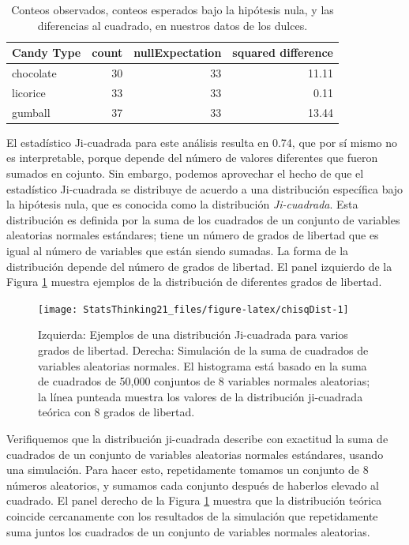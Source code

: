 \documentclass[
  12pt,
]{book}
\begin{document}
\begin{table}

\caption{\label{tab:candyDf}Conteos observados, conteos esperados bajo la hipótesis nula, y las diferencias al cuadrado, en nuestros datos de los dulces.}
\centering
\begin{tabular}[t]{l|r|r|r}
\hline
Candy Type & count & nullExpectation & squared difference\\
\hline
chocolate & 30 & 33 & 11.11\\
\hline
licorice & 33 & 33 & 0.11\\
\hline
gumball & 37 & 33 & 13.44\\
\hline
\end{tabular}
\end{table}

El estadístico Ji-cuadrada para este análisis resulta en 0.74, que por sí mismo no es interpretable, porque depende del número de valores diferentes que fueron sumados en cojunto. Sin embargo, podemos aprovechar el hecho de que el estadístico Ji-cuadrada se distribuye de acuerdo a una distribución específica bajo la hipótesis nula, que es conocida como la distribución \emph{Ji-cuadrada}. Esta distribución es definida por la suma de los cuadrados de un conjunto de variables aleatorias normales estándares; tiene un número de grados de libertad que es igual al número de variables que están siendo sumadas. La forma de la distribución depende del número de grados de libertad. El panel izquierdo de la Figura \ref{fig:chisqDist} muestra ejemplos de la distribución de diferentes grados de libertad.

\begin{figure}
\texttt{[image: StatsThinking21\_files/figure-latex/chisqDist-1]} \caption{Izquierda: Ejemplos de una distribución Ji-cuadrada para varios grados de libertad. Derecha: Simulación de la suma de cuadrados de variables aleatorias normales. El histograma está basado en la suma de cuadrados de 50,000 conjuntos de 8 variables normales aleatorias; la línea punteada muestra los valores de la distribución ji-cuadrada teórica con 8 grados de libertad.}\label{fig:chisqDist}
\end{figure}

Verifiquemos que la distribución ji-cuadrada describe con exactitud la suma de cuadrados de un conjunto de variables aleatorias normales estándares, usando una simulación. Para hacer esto, repetidamente tomamos un conjunto de 8 números aleatorios, y sumamos cada conjunto después de haberlos elevado al cuadrado. El panel derecho de la Figura \ref{fig:chisqDist} muestra que la distribución teórica coincide cercanamente con los resultados de la simulación que repetidamente suma juntos los cuadrados de un conjunto de variables normales aleatorias.
\end{document}
